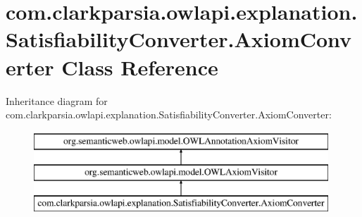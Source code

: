 \hypertarget{classcom_1_1clarkparsia_1_1owlapi_1_1explanation_1_1_satisfiability_converter_1_1_axiom_converter}{\section{com.\-clarkparsia.\-owlapi.\-explanation.\-Satisfiability\-Converter.\-Axiom\-Converter Class Reference}
\label{classcom_1_1clarkparsia_1_1owlapi_1_1explanation_1_1_satisfiability_converter_1_1_axiom_converter}
}
Inheritance diagram for com.\-clarkparsia.\-owlapi.\-explanation.\-Satisfiability\-Converter.\-Axiom\-Converter\-:\begin{figure}[H]
\begin{center}
\leavevmode
\includegraphics[height=3.000000cm]{classcom_1_1clarkparsia_1_1owlapi_1_1explanation_1_1_satisfiability_converter_1_1_axiom_converter}
\end{center}
\end{figure}
